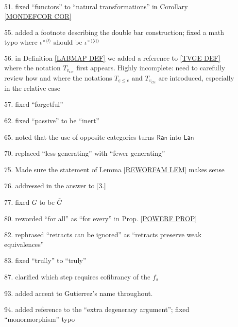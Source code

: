 \documentclass{article}
\begin{document}
\begin{itemize}
\item[51.] fixed ``functors'' to ``natural transformations'' in Corollary \ref{MONDEFCOR COR}

\item[55.] added a footnote describing the double bar construction;
fixed a math typo where $\iota^{\times \langle l \rangle}$ should be 
$\iota^{\times \langle \langle l \rangle \rangle}$

\item[56.] in Definition \ref{LABMAP DEF} we added a reference to \eqref{TVGE DEF} where the notation $T_{v_{Ge}}$ first appears.
{\color{red} Highly incomplete: need to carefully review how and where the notations $T_{\underline{e} \leq e}$ and $T_{v_{Ge}}$
are introduced, especially in the relative case}

\item[57.] fixed ``forgetful''

\item[62.] fixed ``passive'' to be ``inert''

\item[65.] noted that the use of opposite categories turns $\mathsf{Ran}$ into $\mathsf{Lan}$

\item[70.] replaced ``less generating'' with ``fewer generating''
      
\item[75.] Made sure the statement of Lemma \ref{REWORFAM LEM} makes sense

\item[76.] addressed in the answer to [3.]

\item[77.] fixed $G$ to be $\bar{G}$
      
\item[80.] reworded ``for all'' as ``for every'' in Prop. \ref{POWERF PROP}

\item[82.] rephrased ``retracts can be ignored''
as ``retracts preserve weak equivalences''

\item[83.] fixed ``trully'' to ``truly''

\item[87.] clarified which step requires cofibrancy of the 
$f_s$

\item[93.] added accent to Gutierrez's name throughout.

\item[94.] added \cite{Ri14} reference to the ``extra degeneracy argument''; fixed ``monormorphism'' typo


\end{itemize}
\end{document}
